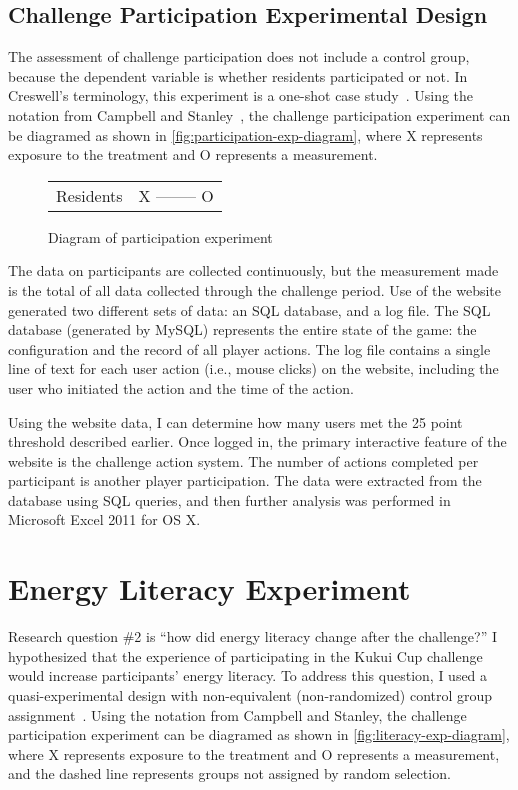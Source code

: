 \subsection{Challenge Participation Experimental Design}

The assessment of challenge participation does not include a control group, because the dependent variable is whether residents participated or not. In Creswell's terminology, this experiment is a one-shot case study~\cite[pg. 168]{Creswell2003}. Using the notation from Campbell and Stanley~\cite{Campbell1963}, the challenge participation experiment can be diagramed as shown in \autoref{fig:participation-exp-diagram}, where X represents exposure to the treatment and O represents a measurement.

\begin{figure}[htbp]
	\centering
	\begin{tabular}{l c}
		Residents & X -------- O \\
	\end{tabular}
	\caption{Diagram of participation experiment}
	\label{fig:participation-exp-diagram}
\end{figure}

The data on participants are collected continuously, but the measurement made is the total of all data collected through the challenge period. Use of the website generated two different sets of data: an SQL database, and a log file. The SQL database (generated by MySQL) represents the entire state of the game: the configuration and the record of all player actions. The log file contains a single line of text for each user action (i.e., mouse clicks) on the website, including the user who initiated the action and the time of the action.

Using the website data, I can determine how many users met the 25 point threshold described earlier. Once logged in, the primary interactive feature of the website is the challenge action system. The number of actions completed per participant is another player participation. The data were extracted from the database using SQL queries, and then further analysis was performed in Microsoft Excel 2011 for OS X.


\section{Energy Literacy Experiment}
\label{sec:energy-literacy-exp}

Research question \#2 is ``how did energy literacy change after the challenge?'' I hypothesized that the experience of participating in the Kukui Cup challenge would increase participants' energy literacy. To address this question, I used a quasi-experimental design with non-equivalent (non-randomized) control group assignment~\cite{Cook1979}. Using the notation from Campbell and Stanley, the challenge participation experiment can be diagramed as shown in \autoref{fig:literacy-exp-diagram}, where X represents exposure to the treatment and O represents a measurement, and the dashed line represents groups not assigned by random selection.

